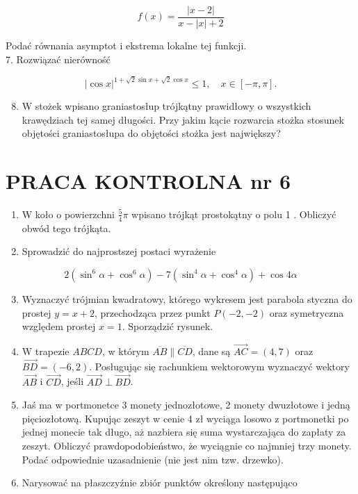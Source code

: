 \documentclass[10pt]{article}
\begin{document}
$$
f(x)=\frac{|x-2|}{x-|x|+2}
$$

Podać równania asymptot i ekstrema lokalne tej funkcji.\\
7. Rozwiązać nierówność

$$
|\cos x|^{1+\sqrt{2} \sin x+\sqrt{2} \cos x} \leqslant 1, \quad x \in[-\pi, \pi] .
$$

\begin{enumerate}
  \setcounter{enumi}{7}
  \item W stożek wpisano graniastosłup trójkątny prawidłowy o wszystkich krawędziach tej samej długości. Przy jakim kącie rozwarcia stożka stosunek objętości graniastosłupa do objętości stożka jest największy?
\end{enumerate}

\section*{PRACA KONTROLNA nr 6}
\begin{enumerate}
  \item W koło o powierzchni $\frac{5}{4} \pi$ wpisano trójkąt prostokątny o polu 1 . Obliczyć obwód tego trójkąta.
  \item Sprowadzić do najprostszej postaci wyrażenie
\end{enumerate}

$$
2\left(\sin ^{6} \alpha+\cos ^{6} \alpha\right)-7\left(\sin ^{4} \alpha+\cos ^{4} \alpha\right)+\cos 4 \alpha
$$

\begin{enumerate}
  \setcounter{enumi}{2}
  \item Wyznaczyć trójmian kwadratowy, którego wykresem jest parabola styczna do prostej $y=x+2$, przechodząca przez punkt $P(-2,-2)$ oraz symetryczna względem prostej $x=1$. Sporządzić rysunek.
  \item W trapezie $A B C D$, w którym $\overline{A B} \| \overline{C D}$, dane są $\overrightarrow{A C}=(4,7)$ oraz $\overrightarrow{B D}=(-6,2)$. Posługując się rachunkiem wektorowym wyznaczyć wektory $\overrightarrow{A B}$ i $\overrightarrow{C D}$, jeśli $\overrightarrow{A D} \perp \overrightarrow{B D}$.
  \item Jaś ma w portmonetce 3 monety jednozłotowe, 2 monety dwuzłotowe i jedną pięciozłotową. Kupując zeszyt w cenie 4 zł wyciąga losowo z portmonetki po jednej monecie tak długo, aż nazbiera się suma wystarczająca do zapłaty za zeszyt. Obliczyć prawdopodobieństwo, że wyciągnie co najmniej trzy monety. Podać odpowiednie uzasadnienie (nie jest nim tzw. drzewko).
  \item Narysować na płaszczyźnie zbiór punktów określony następująco
\end{enumerate}
\end{document}
